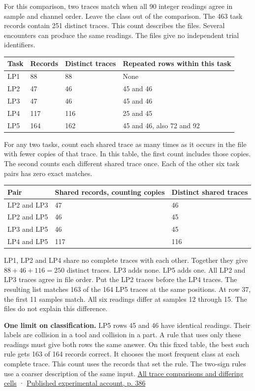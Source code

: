 For this comparison, two traces match when all 90 integer readings agree in sample and channel order. Leave the class out of the comparison. The 463 task records contain 251 distinct traces. This count describes the files. Several encounters can produce the same readings. The files give no independent trial identifiers.

{\def\LTcaptype{none} %
\begin{longtable}[]{@{}llll@{}}
\toprule\noalign{}
Task & Records & Distinct traces & Repeated rows within this task \\
\midrule\noalign{}
\endhead
\bottomrule\noalign{}
\endlastfoot
LP1 & 88 & 88 & None \\
LP2 & 47 & 46 & 45 and 46 \\
LP3 & 47 & 46 & 45 and 46 \\
LP4 & 117 & 116 & 25 and 45 \\
LP5 & 164 & 162 & 45 and 46, also 72 and 92 \\
\end{longtable}
}

For any two tasks, count each shared trace as many times as it occurs in the file with fewer copies of that trace. In this table, the first count includes those copies. The second counts each different shared trace once. Each of the other six task pairs has zero exact matches.

{\def\LTcaptype{none} %
\begin{longtable}[]{@{}lll@{}}
\toprule\noalign{}
Pair & Shared records, counting copies & Distinct shared traces \\
\midrule\noalign{}
\endhead
\bottomrule\noalign{}
\endlastfoot
LP2 and LP3 & 47 & 46 \\
LP2 and LP5 & 46 & 45 \\
LP3 and LP5 & 46 & 45 \\
LP4 and LP5 & 117 & 116 \\
\end{longtable}
}

LP1, LP2 and LP4 share no complete traces with each other. Together they give \(88+46+116=250\) distinct traces. LP3 adds none. LP5 adds one. All LP2 and LP3 traces agree in file order. Put the LP2 traces before the LP4 traces. The resulting list matches 163 of the 164 LP5 traces at the same positions. At row 37, the first 11 samples match. All six readings differ at samples 12 through 15. The files do not explain this difference.

\textbf{One limit on classification.} LP5 rows 45 and 46 have identical readings. Their labels are collision in a tool and collision in a part. A rule that uses only these readings must give both rows the same answer. On this fixed table, the best such rule gets 163 of 164 records correct. It chooses the most frequent class at each complete trace. This count uses the records that set the rule. The two-sign rules use a coarser description of the same input. \href{https://github.com/sepahead/pid-rs/blob/main/audit/research/robot-wrist-slope-signs/trace-provenance.json}{All trace comparisons and differing cells} · \href{https://doi.org/10.1007/978-1-4615-5725-8_23}{Published experimental account, p. 386}

